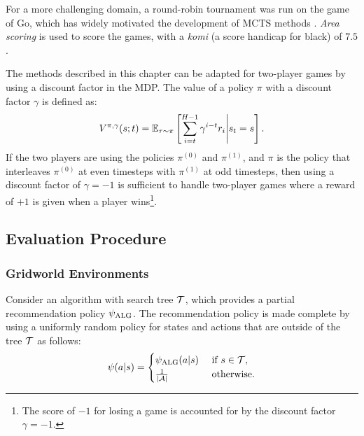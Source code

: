     For a more challenging domain, a round-robin tournament was run on the game of Go, which has widely motivated the development of MCTS methods \cite{offlineonlineuct,alpha_go,alpha_go_zero}. \textit{Area scoring} is used to score the games, with a \textit{komi} (a score handicap for black) of $7.5$. 

    The methods described in this chapter can be adapted for two-player games by using a discount factor in the MDP. The value of a policy $\pi$ with a discount factor $\gamma$ is defined as:
    \begin{align}
        V^{\pi,\gamma}(s;t) = \mathbb{E}_{\tau\sim\pi}\left[\sum_{i=t}^{H-1} \gamma^{i-t}r_i \Bigg| s_t=s \right].
    \end{align}
    If the two players are using the policies $\pi^{(0)}$ and $\pi^{(1)}$, and $\pi$ is the policy that interleaves $\pi^{(0)}$ at even timesteps with $\pi^{(1)}$ at odd timesteps, then using a discount factor of $\gamma=-1$ is sufficient to handle two-player games where a reward of $+1$ is given when a player wins\footnote{The score of $-1$ for losing a game is accounted for by the discount factor $\gamma=-1$.}.
    
    

















\subsection{Evaluation Procedure} 
\label{sec:4-4-2-eval_procedure}


\subsubsection{Gridworld Environments}
\label{sec:4-4-2-1-gridworld_eval_procedure}
    Consider an algorithm with search tree $\mathcal{T}$, which provides a partial recommendation policy $\psi_{{\textnormal{ALG}}}$. The recommendation policy is made complete by using a uniformly random policy for states and actions that are outside of the tree $\mathcal{T}$ as follows:
    \begin{align}
        \psi(a|s) =
        \begin{cases}
            \psi_{{\textnormal{ALG}}}(a|s)  & \text{ if } s\in\mathcal{T}, \\
            \frac{1}{|\mathcal{A}|}      & \text{ otherwise.}
        \end{cases} \label{eq:4:full_recommend}
    \end{align}

